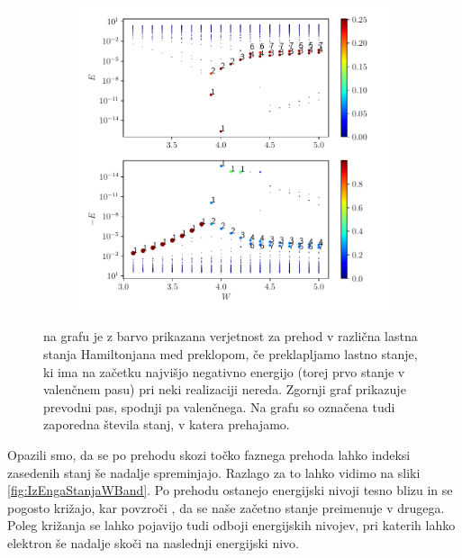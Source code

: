 \begin{figure}[H]
\centering
\begin{subfigure}{\textwidth}
\includegraphics[width=\linewidth]{Figures/IzEngaStanja.pdf}
\end{subfigure}
\caption{na grafu je z barvo prikazana verjetnost za prehod v različna lastna stanja Hamiltonjana med preklopom, če preklapljamo lastno stanje, ki ima na začetku najvišjo negativno energijo (torej prvo stanje v valenčnem pasu) pri neki realizaciji nereda. Zgornji graf prikazuje prevodni pas, spodnji pa valenčnega. Na grafu so označena tudi zaporedna števila stanj, v katera prehajamo.}
\label{fig:IzEngaStanja}
\end{figure}
Opazili smo, da se po prehodu skozi točko faznega prehoda lahko indeksi zasedenih stanj še nadalje spreminjajo. Razlago za to lahko vidimo na sliki \ref{fig:IzEngaStanjaWBand}. Po prehodu ostanejo energijski nivoji tesno blizu in se pogosto križajo, kar povzroči , da se naše začetno stanje preimenuje v drugega. Poleg križanja se lahko pojavijo tudi odboji energijskih nivojev, pri katerih lahko elektron še nadalje skoči na naslednji energijski nivo.

